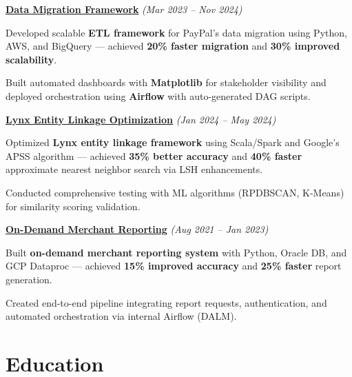 \documentclass[letterpaper,10pt]{article}
\begin{document}
\begin{resume_list}
    \vspace{3pt}
    \item[] \underline{\textbf{Data Migration Framework}} \textit{(Mar 2023 -- Nov 2024)}
    \item Developed scalable \textbf{ETL framework} for PayPal's data migration using Python, AWS, and BigQuery — achieved \textbf{20\% faster migration} and \textbf{30\% improved scalability}.
    \item Built automated dashboards with \textbf{Matplotlib} for stakeholder visibility and deployed orchestration using \textbf{Airflow} with auto-generated DAG scripts.
    
    \vspace{3pt}
    \item[] \underline{\textbf{Lynx Entity Linkage Optimization}} \textit{(Jan 2024 -- May 2024)}
    \item Optimized \textbf{Lynx entity linkage framework} using Scala/Spark and Google's APSS algorithm — achieved \textbf{35\% better accuracy} and \textbf{40\% faster} approximate nearest neighbor search via LSH enhancements.
    \item Conducted comprehensive testing with ML algorithms (RPDBSCAN, K-Means) for similarity scoring validation.
    
    \vspace{3pt}
    \item[] \underline{\textbf{On-Demand Merchant Reporting}} \textit{(Aug 2021 -- Jan 2023)}
    \item Built \textbf{on-demand merchant reporting system} with Python, Oracle DB, and GCP Dataproc — achieved \textbf{15\% improved accuracy} and \textbf{25\% faster} report generation.
    \item Created end-to-end pipeline integrating report requests, authentication, and automated orchestration via internal Airflow (DALM).
\end{resume_list}

\vspace{8pt}

\section{Education}

\end{document}
